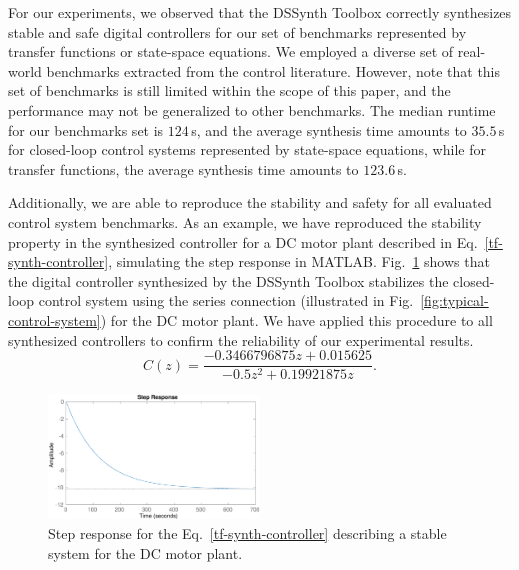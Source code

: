 \documentclass[10pt,conference]{IEEEtran}
\newcommand\tool{{DSSynth Toolbox}\xspace}
\begin{document}

For our experiments, we observed that the \tool correctly synthesizes stable
and safe digital controllers for our set of benchmarks represented by
transfer functions or state-space equations.  We employed a diverse set of
real-world benchmarks extracted from the control literature.  However, note
that this set of benchmarks is still limited within the scope of this paper,
and the performance may not be generalized to other benchmarks.  The median
runtime for our benchmarks set is $124$\,s, and the average synthesis time
amounts to $35.5$\,s for closed-loop control systems represented by
state-space equations, while for transfer functions, the average synthesis
time amounts to $123.6$\,s.

Additionally, we are able to reproduce the stability and safety for all
evaluated control system benchmarks.  As an example, we have reproduced the
stability property in the synthesized controller for a DC motor plant
described in Eq.~\eqref{tf-synth-controller}, simulating the step response
in MATLAB.  Fig.~\ref{tf-step-response} shows that the digital controller
synthesized by the \tool stabilizes the closed-loop control system using the
series connection (illustrated in Fig.~\ref{fig:typical-control-system}) for
the DC motor plant.  We have applied this procedure to all synthesized
controllers to confirm the reliability of our experimental results.
%
\begin{equation}
\label{tf-synth-controller}
C(z)=\frac{-0.3466796875z+0.015625}{-0.5z^{2}+0.19921875z}.
\end{equation}

\begin{figure}[ht]
  \includegraphics[width=0.5\textwidth]{tf-step-response.eps}
  \caption{Step response for the Eq.~\eqref{tf-synth-controller} describing a stable system for the DC motor plant.}
  \label{tf-step-response}
\end{figure}
\end{document}

